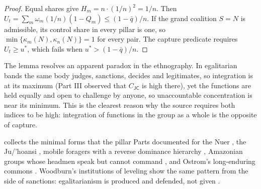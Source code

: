 \documentclass[11pt,letterpaper]{article}
\theoremstyle{definition}
\theoremstyle{remark}
\newcommand{\pJ}{\mathsf{J}}
\newcommand{\pC}{\mathsf{C}}
\begin{document}
\begin{proof}
Equal shares give $H_m=n\cdot(1/n)^2=1/n$. Then $U_t=\sum_m\omega_m(1/n)(1-Q_m)\le(1-\bar q)/n$. If the grand coalition $S=N$ is admissible, its control share in every pillar is one, so $\min\{\kappa_m(N),\kappa_n(N)\}=1$ for every pair. The capture predicate requires $U_t\ge u^{*}$, which fails when $u^{*}>(1-\bar q)/n$.
\end{proof}

The lemma resolves an apparent paradox in the ethnography. In egalitarian bands the same body judges, sanctions, decides and legitimates, so integration is at its maximum (Part III observed that $C_{\pJ\pC}$ is high there), yet the functions are held equally and open to challenge by anyone, so unaccountable concentration is near its minimum. This is the clearest reason why the source requires both indices to be high: integration of functions in the group as a whole is the opposite of capture.

 collects the minimal forms that the pillar Parts documented for the Nuer \citep{evanspritchard1940}, the Ju/'hoansi \citep{marshall1976,lee1979,lee2013,wiessner2005}, mobile foragers with a reverse dominance hierarchy \citep{boehm1999}, Amazonian groups whose headmen speak but cannot command \citep{clastres1987}, and Ostrom's long-enduring commons \citep{ostrom1990,cox2010}. Woodburn's institutions of leveling show the same pattern from the side of sanctions: egalitarianism is produced and defended, not given \citep{woodburn1982}.
\end{document}
